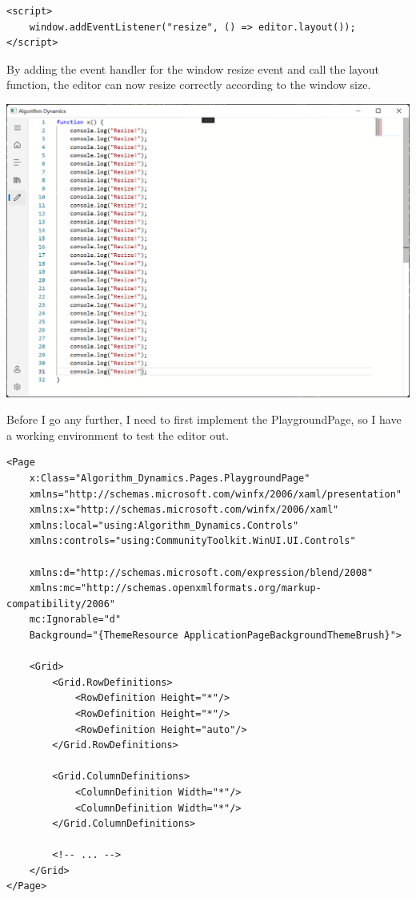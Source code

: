 \documentclass[a4paper]{report}
\begin{document}
\begin{verbatim}
<script>
    window.addEventListener("resize", () => editor.layout());
</script>
\end{verbatim}

By adding the event handler for the window resize event and call the layout function, the editor can now resize correctly according to the window size.

\includegraphics[width=\textwidth, height=\textheight, keepaspectratio]{PlaygroundPage-WebView2-ResizeSuccess}

Before I go any further, I need to first implement the PlaygroundPage, so I have a working environment to test the editor out.

\begin{verbatim}
<Page
    x:Class="Algorithm_Dynamics.Pages.PlaygroundPage"
    xmlns="http://schemas.microsoft.com/winfx/2006/xaml/presentation"
    xmlns:x="http://schemas.microsoft.com/winfx/2006/xaml"
    xmlns:local="using:Algorithm_Dynamics.Controls"
    xmlns:controls="using:CommunityToolkit.WinUI.UI.Controls"

    xmlns:d="http://schemas.microsoft.com/expression/blend/2008"
    xmlns:mc="http://schemas.openxmlformats.org/markup-compatibility/2006"
    mc:Ignorable="d"
    Background="{ThemeResource ApplicationPageBackgroundThemeBrush}">

    <Grid>
        <Grid.RowDefinitions>
            <RowDefinition Height="*"/>
            <RowDefinition Height="*"/>
            <RowDefinition Height="auto"/>
        </Grid.RowDefinitions>

        <Grid.ColumnDefinitions>
            <ColumnDefinition Width="*"/>
            <ColumnDefinition Width="*"/>
        </Grid.ColumnDefinitions>

        <!-- ... -->
    </Grid> 
</Page>
\end{verbatim}
\end{document}
